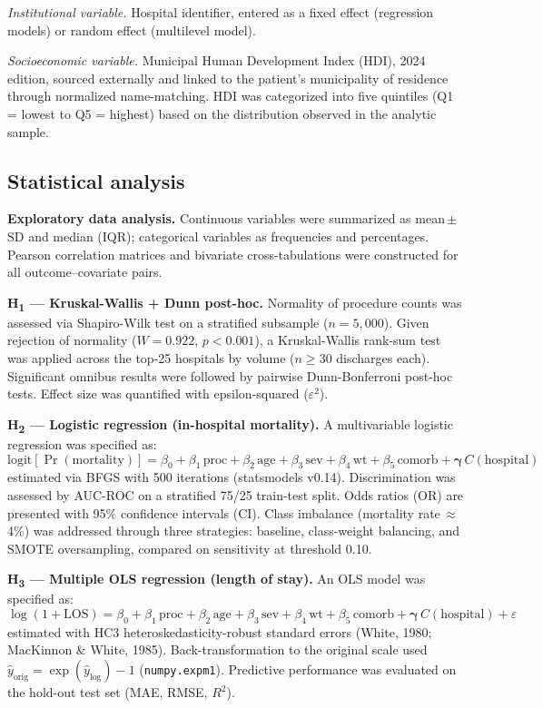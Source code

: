 \documentclass[10pt,twocolumn]{article}
\begin{document}
\textit{Institutional variable.} Hospital identifier, entered as a fixed effect
(regression models) or random effect (multilevel model).

\textit{Socioeconomic variable.} Municipal Human Development Index (HDI), 2024 edition,
sourced externally and linked to the patient's municipality of residence through
normalized name-matching. HDI was categorized into five quintiles (Q1 = lowest to
Q5 = highest) based on the distribution observed in the analytic sample.

\subsection{Statistical analysis}

\textbf{Exploratory data analysis.} Continuous variables were summarized as mean\,$\pm$\,SD
and median (IQR); categorical variables as frequencies and percentages. Pearson
correlation matrices and bivariate cross-tabulations were constructed for all
outcome–covariate pairs.

\textbf{H\textsubscript{1} — Kruskal-Wallis + Dunn post-hoc.}
Normality of procedure counts was assessed via Shapiro-Wilk test on a stratified
subsample ($n = 5{,}000$). Given rejection of normality ($W = 0{.}922$,
$p < 0{.}001$), a Kruskal-Wallis rank-sum test was applied across the top-25
hospitals by volume ($n \geq 30$ discharges each). Significant omnibus results were
followed by pairwise Dunn-Bonferroni post-hoc tests. Effect size was quantified
with epsilon-squared ($\varepsilon^2$).

\textbf{H\textsubscript{2} — Logistic regression (in-hospital mortality).}
A multivariable logistic regression was specified as:
\begin{equation*}
  \text{logit}[\Pr(\text{mortality})] = \beta_0 + \beta_1\,\text{proc} +
  \beta_2\,\text{age} + \beta_3\,\text{sev} + \beta_4\,\text{wt} +
  \beta_5\,\text{comorb} + \boldsymbol{\gamma}\,C(\text{hospital})
\end{equation*}
estimated via BFGS with 500 iterations (statsmodels v0.14). Discrimination was
assessed by AUC-ROC on a stratified 75/25 train-test split. Odds ratios (OR) are
presented with 95\% confidence intervals (CI). Class imbalance (mortality rate\,$\approx$\,4\%)
was addressed through three strategies: baseline, class-weight balancing, and
SMOTE oversampling, compared on sensitivity at threshold 0.10.

\textbf{H\textsubscript{3} — Multiple OLS regression (length of stay).}
An OLS model was specified as:
\begin{equation*}
  \log(1 + \text{LOS}) = \beta_0 + \beta_1\,\text{proc} + \beta_2\,\text{age} +
  \beta_3\,\text{sev} + \beta_4\,\text{wt} + \beta_5\,\text{comorb} +
  \boldsymbol{\gamma}\,C(\text{hospital}) + \varepsilon
\end{equation*}
estimated with HC3 heteroskedasticity-robust standard errors (White, 1980;
MacKinnon \& White, 1985). Back-transformation to the original scale used
$\hat{y}_{\text{orig}} = \exp(\hat{y}_{\log}) - 1$ (\texttt{numpy.expm1}).
Predictive performance was evaluated on the hold-out test set (MAE, RMSE, $R^2$).
\end{document}

